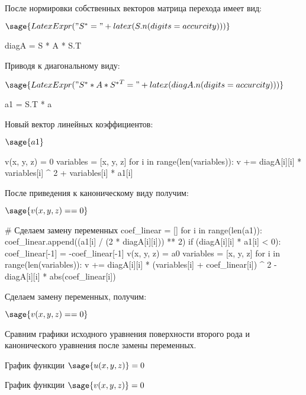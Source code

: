 \documentclass[14pt, a4paper]{article}
\begin{document}
После нормировки собственных векторов матрица перехода имеет вид:

$\sage{LatexExpr("S^* = " + latex(S.n(digits = accurcity)))}$

\begin{sagesilent}
    diagA = S * A * S.T
\end{sagesilent}

Приводя к диагональному виду:

$\sage{LatexExpr("S^{*} * A * {S^{*}}^T = " + latex(diagA.n(digits = accurcity)))}$

\begin{sagesilent}
    a1 = S.T * a
\end{sagesilent}

Новый вектор линейных коэффициентов:

$\sage{a1}$

\begin{sagesilent}
    v(x, y, z) = 0
    variables = [x, y, z]
    for i in range(len(variables)):
        v += diagA[i][i] * variables[i] ^ 2 + variables[i] * a1[i]
\end{sagesilent}

После приведения к каноническому виду получим:

$\sage{v(x, y, z) == 0}$

\begin{sagesilent}
    # Сделаем замену переменных
    coef_linear = []
    for i in range(len(a1)):
        coef_linear.append((a1[i] / (2 * diagA[i][i])) ** 2)
        if (diagA[i][i] * a1[i] < 0):
            coef_linear[-1] = -coef_linear[-1]
    v(x, y, z) = a0
    variables = [x, y, z]
    for i in range(len(variables)):
        v += diagA[i][i] * (variables[i] + coef_linear[i]) ^ 2 - diagA[i][i] * abs(coef_linear[i])
\end{sagesilent}

Сделаем замену переменных, получим:

$\sage{v(x, y, z) == 0}$

\pagebreak

Сравним графики исходного уравнения поверхности второго рода и канонического уравнения после замены переменных.

График функции $\sage{u(x, y, z)} = 0$
\begin{center}
\end{center}

График функции $\sage{v(x, y, z)} = 0$
\begin{center}
\end{center}
\end{document}

